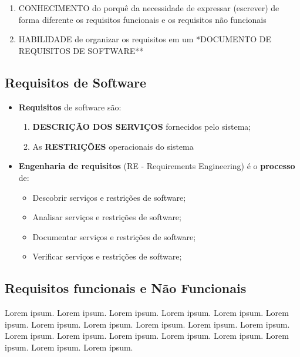 \documentclass[
]{book}
\providecommand{\tightlist}{%
  \setlength{\itemsep}{0pt}\setlength{\parskip}{0pt}}
\begin{document}
\begin{enumerate}
\def\labelenumi{\arabic{enumi}.}
\setcounter{enumi}{1}
\tightlist
\item
  CONHECIMENTO do porquê da necessidade de expressar (escrever) de forma diferente os requisitos funcionais e os requisitos não funcionais
\item
  HABILIDADE de organizar os requisitos em um *DOCUMENTO DE REQUISITOS DE SOFTWARE**
\end{enumerate}

\hypertarget{requisitos-de-software}{%
\subsection{Requisitos de Software}\label{requisitos-de-software}}

\begin{itemize}
\tightlist
\item
  \textbf{Requisitos} de software são:

  \begin{enumerate}
  \def\labelenumi{\arabic{enumi}.}
  \tightlist
  \item
    \textbf{DESCRIÇÃO DOS SERVIÇOS} fornecidos pelo sistema;
  \item
    As \textbf{RESTRIÇÕES} operacionais do sistema
  \end{enumerate}
\item
  \textbf{Engenharia de requisitos} (RE - Requirements Engineering) é o \textbf{processo} de:

  \begin{itemize}
  \tightlist
  \item
    Descobrir serviços e restrições de software;
  \item
    Analisar serviços e restrições de software;
  \item
    Documentar serviços e restrições de software;
  \item
    Verificar serviços e restrições de software;
  \end{itemize}
\end{itemize}

\hypertarget{requisitos-funcionais-e-nuxe3o-funcionais}{%
\subsection{Requisitos funcionais e Não Funcionais}\label{requisitos-funcionais-e-nuxe3o-funcionais}}

Lorem ipsum. Lorem ipsum. Lorem ipsum. Lorem ipsum. Lorem ipsum. Lorem ipsum. Lorem ipsum. Lorem ipsum. Lorem ipsum. Lorem ipsum. Lorem ipsum. Lorem ipsum. Lorem ipsum. Lorem ipsum. Lorem ipsum. Lorem ipsum. Lorem ipsum. Lorem ipsum. Lorem ipsum.
\end{document}
